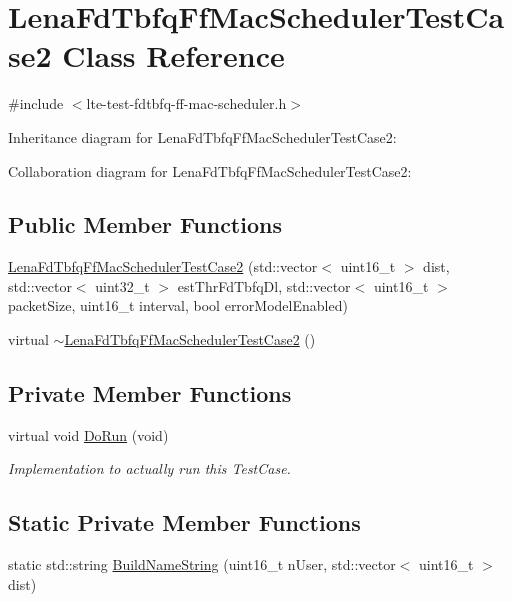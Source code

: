 \hypertarget{classLenaFdTbfqFfMacSchedulerTestCase2}{}\section{Lena\+Fd\+Tbfq\+Ff\+Mac\+Scheduler\+Test\+Case2 Class Reference}
\label{classLenaFdTbfqFfMacSchedulerTestCase2}


{\ttfamily \#include $<$lte-\/test-\/fdtbfq-\/ff-\/mac-\/scheduler.\+h$>$}



Inheritance diagram for Lena\+Fd\+Tbfq\+Ff\+Mac\+Scheduler\+Test\+Case2\+:


Collaboration diagram for Lena\+Fd\+Tbfq\+Ff\+Mac\+Scheduler\+Test\+Case2\+:
\subsection*{Public Member Functions}
\begin{DoxyCompactItemize}
\item 
\hyperlink{classLenaFdTbfqFfMacSchedulerTestCase2_a4fa2a13dd0f949656dde8f737144581e}{Lena\+Fd\+Tbfq\+Ff\+Mac\+Scheduler\+Test\+Case2} (std\+::vector$<$ uint16\+\_\+t $>$ dist, std\+::vector$<$ uint32\+\_\+t $>$ est\+Thr\+Fd\+Tbfq\+Dl, std\+::vector$<$ uint16\+\_\+t $>$ packet\+Size, uint16\+\_\+t interval, bool error\+Model\+Enabled)
\item 
virtual \hyperlink{classLenaFdTbfqFfMacSchedulerTestCase2_aaa402f6ff04a7c15e6ec186af31b72ad}{$\sim$\+Lena\+Fd\+Tbfq\+Ff\+Mac\+Scheduler\+Test\+Case2} ()
\end{DoxyCompactItemize}
\subsection*{Private Member Functions}
\begin{DoxyCompactItemize}
\item 
virtual void \hyperlink{classLenaFdTbfqFfMacSchedulerTestCase2_a2e43d4f9483463dffa86410a1ce47140}{Do\+Run} (void)
\begin{DoxyCompactList}\small\item\em Implementation to actually run this Test\+Case. \end{DoxyCompactList}\end{DoxyCompactItemize}
\subsection*{Static Private Member Functions}
\begin{DoxyCompactItemize}
\item 
static std\+::string \hyperlink{classLenaFdTbfqFfMacSchedulerTestCase2_ace1940dc6f6374d251ba1e1f70e74e4a}{Build\+Name\+String} (uint16\+\_\+t n\+User, std\+::vector$<$ uint16\+\_\+t $>$ dist)
\end{DoxyCompactItemize}
